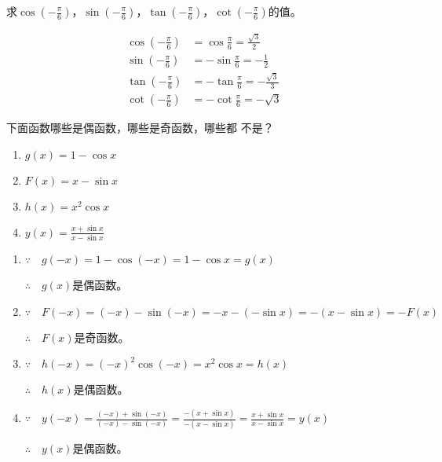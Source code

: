 \begin{example}
求$\cos\left(-\frac{\pi}{6}\right)$，$\sin \left(-\frac{\pi}{6}\right)$，$\tan\left(-\frac{\pi}{6}\right)$，$\cot\left(-\frac{\pi}{6}\right)$的值。    
\end{example}

\begin{solution}
\[\begin{split}
\cos\left(-\frac{\pi}{6}\right)&=\cos\frac{\pi}{6}=\frac{\sqrt{3}}{2}  \\
\sin\left(-\frac{\pi}{6}\right)&=-\sin\frac{\pi}{6}=-\frac{1}{2} \\
\tan\left(-\frac{\pi}{6}\right)&=-\tan\frac{\pi}{6}=-\frac{\sqrt{3}}{3}   \\
\cot\left(-\frac{\pi}{6}\right)&=-\cot\frac{\pi}{6}=-\sqrt{3}
\end{split}\]
\end{solution}

\begin{example}
    下面函数哪些是偶函数，哪些是奇函数，哪些都
不是？
\begin{multicols}{2}
\begin{enumerate}
    \item $g(x)=1-\cos x$
    \item $F(x)=x-\sin x$
    \item $h(x)=x^2\cos x$
    \item $y(x)=\frac{x+\sin x}{x-\sin x}$
\end{enumerate}
\end{multicols}
\end{example}

\begin{solution}
\begin{enumerate}
    \item $\because\quad g(-x)=1-\cos(-x)=1-\cos x=g(x)$
    
    $\therefore\quad g(x)$是偶函数。
    \item $\because\quad F(-x)=(-x)-\sin(-x)=-x-(-\sin x)=-(x-\sin x)=-F(x)$
    
    $\therefore\quad F(x)$是奇函数。
    \item $\because\quad h(-x)=(-x)^2\cos(-x)=x^2\cos x=h(x)$
    
    $\therefore\quad h(x)$是偶函数。
    \item $\because\quad y(-x)=\frac{(-x)+\sin (-x)}{(-x)-\sin (-x)}=\frac{-(x+\sin x)}{-(x-\sin x)}=\frac{x+\sin x}{x-\sin x}=y(x)$
    
    $\therefore\quad y(x)$是偶函数。
\end{enumerate}
\end{solution}

